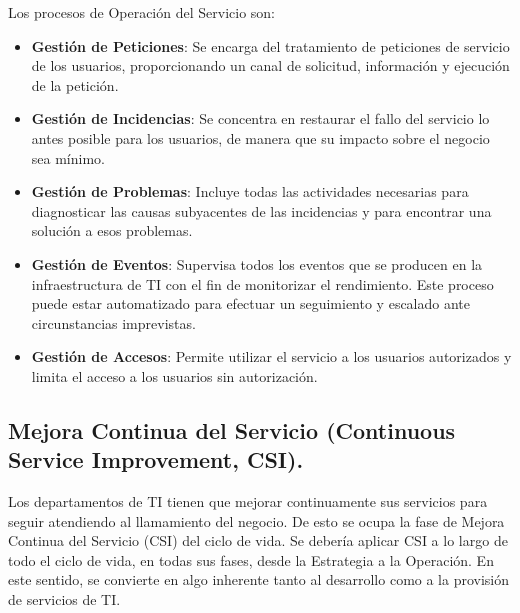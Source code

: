 Los procesos de Operación del Servicio son: 

\begin{itemize}
	\item \textbf{Gestión de Peticiones}: Se encarga del tratamiento de peticiones de servicio de los usuarios, proporcionando un canal de solicitud, información y ejecución de la petición. 
\item \textbf{Gestión de Incidencias}: Se concentra en restaurar el fallo del servicio lo antes posible para los usuarios, de manera que su impacto sobre el negocio sea mínimo. 
\item\textbf{ Gestión de Problemas}: Incluye todas las actividades necesarias para diagnosticar las causas subyacentes de las incidencias y para encontrar una solución a esos problemas. 
\item \textbf{Gestión de Eventos}: Supervisa todos los eventos que se producen en la infraestructura de TI con el fin de monitorizar el rendimiento. Este proceso puede estar automatizado para efectuar un seguimiento y escalado ante circunstancias imprevistas.
\item \textbf{Gestión de Accesos}: Permite utilizar el servicio a los usuarios autorizados y limita el acceso a los usuarios sin autorización.
	
\end{itemize}


\subsection{Mejora Continua del Servicio (Continuous Service Improvement, CSI).}

Los departamentos de TI tienen que mejorar continuamente sus servicios para seguir atendiendo al llamamiento del negocio. De esto se ocupa la fase de Mejora Continua del Servicio (CSI) del ciclo de vida.
Se debería aplicar CSI a lo largo de todo el ciclo de vida, en todas sus fases, desde la Estrategia a la Operación. En este sentido, se convierte en algo inherente tanto al desarrollo como a la provisión de servicios de TI.
